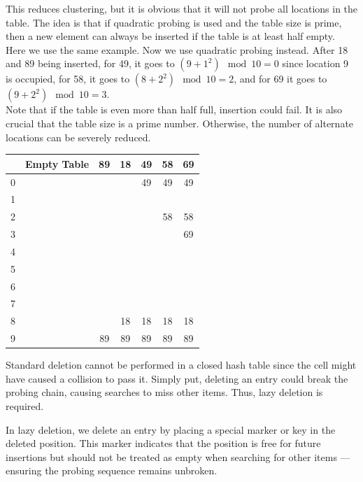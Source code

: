 \begin{minipage}{0.5\textwidth}
This reduces clustering, but it is obvious that it will not probe all locations in the table. The idea is that if quadratic probing is used and the table size is prime, then a new element can always be inserted if the table is at least half empty. \\[5pt]
Here we use the same example. Now we use quadratic probing instead. After 18 and 89 being inserted, for 49, it goes to \((9 + 1^2) \mod 10 = 0\) since location 9 is occupied, for 58, it goes to \((8 + 2^2) \mod 10 = 2\), and for 69 it goes to \((9 + 2^2) \mod 10 = 3\). \\[5pt]
Note that if the table is even more than half full, insertion could fail. It is also crucial that the table size is a prime number. Otherwise, the number of alternate locations can be severely reduced.
\end{minipage}
\begin{minipage}{0.5\textwidth}
\begin{table}[H]
  \centering
  \begin{tabular}{c|c|c|c|c|c|c}
      \toprule
        & Empty Table & 89 & 18 & 49 & 58 & 69  \\
    \midrule
      0 &  &  &  & 49 & 49 & 49  \\
      1 &  &  &  &  &  &   \\
      2 &  &  &  &  & 58 & 58  \\
      3 &  &  &  &  &  & 69  \\
      4 &  &  &  &  &  &   \\
      5 &  &  &  &  &  &   \\
      6 &  &  &  &  &  &   \\
      7 &  &  &  &  &  &   \\
      8 &  &  & 18 & 18 & 18 & 18  \\
      9 &  & 89 & 89 & 89 & 89 & 89  \\
      \bottomrule
  \end{tabular}
\end{table}
\end{minipage}

Standard deletion cannot be performed in a closed hash table since the cell might have caused a collision to pass it. Simply put, deleting an entry could break the probing chain, causing searches to miss other items. Thus, lazy deletion is required.

In lazy deletion, we delete an entry by placing a special marker or key in the deleted position. This marker indicates that the position is free for future insertions but should not be treated as empty when searching for other items — ensuring the probing sequence remains unbroken.

